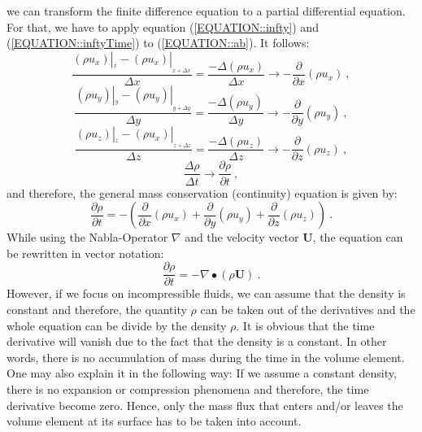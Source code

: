 %
%
	we can transform the finite difference equation to a partial differential
    equation. For that, we have to apply equation (\ref{EQUATION::infty}) and
    (\ref{EQUATION::inftyTime}) to (\ref{EQUATION::ab}). It follows:
%
%
\begin{equation}
 \frac{(\rho u_x)|_{_x} - (\rho u_x)|_{_{x+\Delta x}}}{\Delta x} = \frac{-\Delta (\rho u_x)}{\Delta x}
\longrightarrow
-\frac{\partial}{\partial x} (\rho u_x)~,
\end{equation}
\begin{equation}
\frac{(\rho u_y)|_{_y} - (\rho u_y)|_{_{y+\Delta y}}}{\Delta y} = \frac{-\Delta (\rho u_y)}{\Delta y}
\longrightarrow
-\frac{\partial}{\partial y} (\rho u_y) ~,
\end{equation}
\begin{equation}
\frac{(\rho u_z)|_{_z} - (\rho u_x)|_{_{z+\Delta z}}}{\Delta z} = \frac{-\Delta (\rho u_z)}{\Delta z}
\longrightarrow
-\frac{\partial}{\partial z} (\rho u_z) ~,
\end{equation}
\begin{equation}
  \frac{\Delta \rho}{\Delta t} \to \frac{\partial \rho}{\partial t} ~,
\end{equation}
%
%
%
%
	and therefore, the general mass conservation (continuity) equation is
    given by:
%
%
\begin{equation}
\boxed{
 \frac{\partial \rho}{\partial t} =
 - \left(
      \frac{\partial}{\partial x} (\rho u_x)
    + \frac{\partial}{\partial y} (\rho u_y)
    + \frac{\partial}{\partial z} (\rho u_z)
   \right)
   } ~.
\end{equation}
%
%
	While using the Nabla-Operator $\nabla$ and the velocity vector
    \textbf{U}, the equation can be rewritten in vector notation:
%
%
\begin{equation}
\boxed{
 \frac{\partial \rho}{\partial t} =
 -   \nabla \bullet \left(\rho \textbf{U}\right)
   } ~.
   \label{EQUATION::massCompressible}
\end{equation}
%
%
	However, if we focus on incompressible fluids, we can assume that the
    density is constant and therefore, the quantity $\rho$ can be taken out of
    the derivatives and the whole equation can be divide by the density $\rho$.
    It is obvious that the time derivative will vanish due to the fact that
    the density is a constant. In other words, there is no accumulation of
    mass during the time in the volume element.
    One may also explain it in the following way: If we assume a constant
    density, there is no expansion or compression phenomena and therefore,
    the time derivative become zero. Hence, only the mass flux that enters
    and/or leaves the volume element at its surface has to be taken into account.

